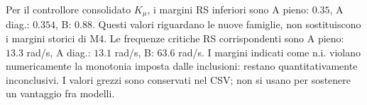 Per il controllore consolidato $K_\mu$, i margini RS inferiori sono A pieno: $0.35$, A diag.: $0.354$, B: $0.88$. Questi valori riguardano le nuove famiglie, non sostituiscono i margini storici di M4. Le frequenze critiche RS corrispondenti sono A pieno: $13.3$ rad/s, A diag.: $13.1$ rad/s, B: $63.6$ rad/s.
 I margini indicati come n.i. violano numericamente la monotonia imposta dalle inclusioni: restano quantitativamente inconclusivi. I valori grezzi sono conservati nel CSV; non si usano per sostenere un vantaggio fra modelli.
